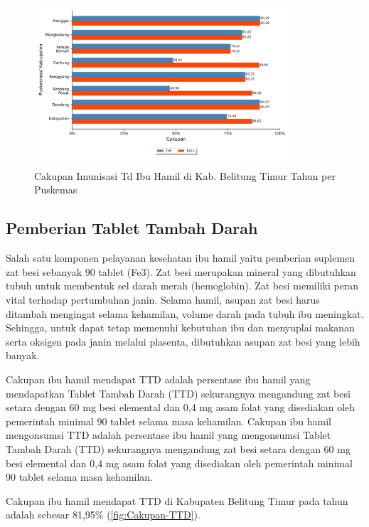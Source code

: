 \begin{figure}[H]
    \centering{}
    \includegraphics[width=0.85\textwidth]{bab_05/bab_05_04_Td}
    \caption{Cakupan Imunisasi Td Ibu Hamil di Kab. Belitung Timur Tahun \tP per Puskemas}
    \label{fig:Cakupan-Td}
\end{figure}

\subsection{Pemberian Tablet Tambah Darah}
Salah satu komponen pelayanan kesehatan ibu hamil yaitu pemberian suplemen zat besi sebanyak 90 tablet (Fe3).
Zat besi merupakan mineral yang dibutuhkan tubuh untuk membentuk sel darah merah (hemoglobin).
Zat besi memiliki peran vital terhadap pertumbuhan janin.
Selama hamil, asupan zat besi harus ditambah mengingat selama kehamilan, volume darah pada tubuh ibu meningkat.
Sehingga, untuk dapat tetap memenuhi kebutuhan ibu dan menyuplai makanan serta oksigen pada janin melalui plasenta, dibutuhkan asupan zat besi yang lebih banyak.

Cakupan ibu hamil mendapat TTD adalah persentase ibu hamil yang mendapatkan Tablet Tambah Darah (TTD) sekurangnya mengandung zat besi setara dengan 60 mg besi elemental dan 0,4 mg asam folat yang disediakan oleh pemerintah minimal 90 tablet selama masa kehamilan. Cakupan ibu hamil mengonsumsi TTD adalah persentase ibu hamil yang mengonsumsi Tablet Tambah Darah (TTD) sekurangnya mengandung zat besi setara dengan 60 mg besi elemental dan 0,4 mg asam folat yang disediakan oleh pemerintah minimal 90 tablet selama masa kehamilan.

Cakupan ibu hamil mendapat TTD di Kabupaten Belitung Timur pada tahun \tP adalah sebesar 81,95\% (\autoref{fig:Cakupan-TTD}).

